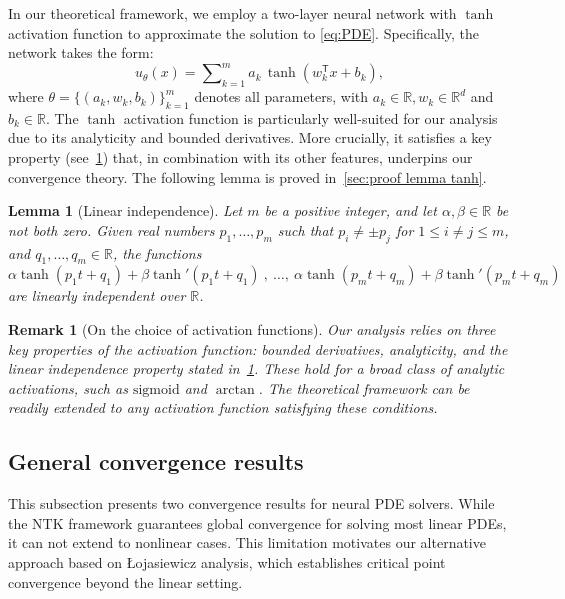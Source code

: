 \documentclass{article}
\newtheorem{remark}{Remark}
\newtheorem{lemma}{Lemma}
\newcommand{\T}{\mathsf{T}}
\begin{document}
In our theoretical framework, we employ a two-layer neural network with $\tanh$ activation function to approximate the solution to \cref{eq:PDE}. 
Specifically, the network takes the form:  
\begin{equation}
u_{\theta}(x) = \sum\nolimits_{k=1}^{m} a_k \, \tanh(w_k^\T x + b_k), \label{eq:nn}
\end{equation}
where $\theta = \{(a_k, w_k, b_k)\}_{k=1}^{m}$ denotes all parameters, with $a_k\in \mathbb{R}, w_k \in \mathbb{R}^{d}$ and $b_k \in \mathbb{R}$. 
The $\tanh$ activation function is particularly well-suited for our analysis due to its analyticity and bounded derivatives. 
More crucially, it satisfies a key property (see~\cref{lemma:tanh}) that, in combination with its other features, underpins our convergence theory. 
The following lemma is proved in~\cref{sec:proof lemma tanh}.
\begin{lemma}[Linear independence]\label{lemma:tanh}
    Let \(m\) be a positive integer, and let \(\alpha, \beta \in \mathbb{R}\) be not both zero. Given real numbers \(p_1, \ldots, p_m\) such that \(p_i \neq \pm p_j\) for \(1 \le i \neq j\le m\), and \(q_1, \ldots, q_m \in \mathbb{R}\), the functions
    $
      \alpha \tanh(p_1 t + q_1)+\beta \tanh'(p_1 t + q_1)\ ,\ \ldots, \ \alpha \tanh(p_m t + q_m)+\beta \tanh'(p_m t + q_m)
    $
    are linearly independent over \(\mathbb{R}\).
\end{lemma}
\begin{remark}[On the choice of activation functions]
Our analysis relies on three key properties of the activation function: bounded derivatives, analyticity, and the linear independence property stated in~\cref{lemma:tanh}. 
These hold for a broad class of analytic activations, such as $\mathrm{sigmoid}$ and $\arctan$. 
The theoretical framework can be readily extended to any activation function satisfying these conditions.
\end{remark}

\subsection{General convergence results}\label{sec:general convergence results}
This subsection presents two convergence results for neural PDE solvers. While the NTK framework guarantees global convergence for solving most linear PDEs, it can not extend to nonlinear cases. 
This limitation motivates our alternative approach based on \L{}ojasiewicz analysis, which establishes critical point convergence beyond the linear setting.
\end{document}
